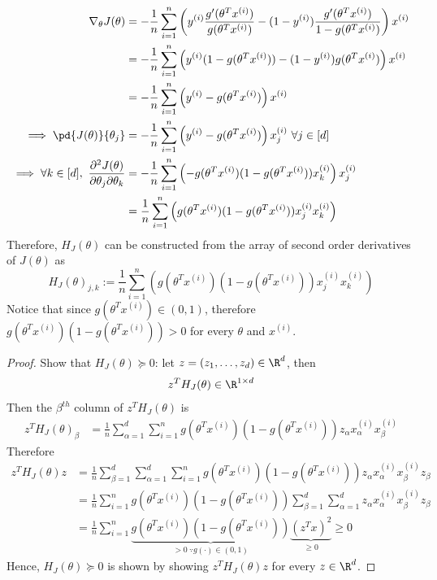 \documentclass[11pt]{article}
\newcommand{\upi}[0]{^{(i)}}
\begin{document}
	\begin{align}
		\nabla_\theta J(\theta) &= - \frac{1}{n} \sum_{i=1}^n \left(
		y\upi \frac{g'(\theta^T x\upi)}{g(\theta^T x\upi)}
		- (1 - y\upi) \frac{g'(\theta^T x\upi)}{1-g(\theta^T x\upi)}
		\right) x\upi \\
		&= - \frac{1}{n} \sum_{i=1}^n \left(
		y\upi (1 - g(\theta^T x\upi)) - (1 - y\upi) g(\theta^T x\upi)
		\right) x\upi \\
		&= - \frac{1}{n} \sum_{i=1}^n \left(
		y\upi - g(\theta^T x\upi)
		\right ) x\upi \\
		\implies \pd{J(\theta)}{\theta_j} &= - \frac{1}{n} \sum_{i=1}^n \left(
		y\upi - g(\theta^T x\upi)
		\right ) x\upi_j\ \forall j \in [d]\\
		\implies \forall k \in [d],\ \frac{\partial^2 J(\theta)}{\partial \theta_j \partial \theta_k} &= -\frac{1}{n}\sum_{i=1}^n \left (
		- g(\theta^T x\upi) (1-g(\theta^T x\upi)) x\upi_k
		\right) x\upi_j \\
		&= \frac{1}{n}\sum_{i=1}^n \left (
		g(\theta^T x\upi) (1-g(\theta^T x\upi)) x\upi_j x\upi_k
		\right)
	\end{align}
	Therefore, $H_J (\theta)$ can be constructed from the array of second order derivatives of $J(\theta)$ as 
	\begin{equation}
		H_J(\theta)_{j, k} := \frac{1}{n}\sum_{i=1}^n \left (
		g(\theta^T x\upi) (1-g(\theta^T x\upi)) x\upi_j x\upi_k
		\right)
	\end{equation}
	Notice that since $g(\theta^T x\upi) \in (0, 1)$, therefore $g(\theta^T x\upi) (1-g(\theta^T x\upi)) > 0$ for every $\theta$ and $x\upi$.
	\begin{proof} Show that $H_J (\theta) \succeq 0$: let $z = (z_1,\dots,z_d) \in \R^d$, then
		\begin{align}
			z^T H_J (\theta) \in \R^{1 \times d}
		\end{align}
		Then the $\beta^{th}$ column of $z^T H_J (\theta)$ is
		\begin{align}
			z^T H_J (\theta)_{\beta} &= \frac{1}{n} \sum_{\alpha=1}^d \sum_{i=1}^n g(\theta^T x\upi) (1-g(\theta^T x\upi)) z_\alpha x\upi_\alpha x\upi_\beta
		\end{align}
		Therefore
		\begin{align}
			z^T H_J(\theta) z &= \frac{1}{n} \sum_{\beta=1}^d \sum_{\alpha=1}^d \sum_{i=1}^n g(\theta^T x\upi) (1-g(\theta^T x\upi)) z_\alpha x\upi_\alpha x\upi_\beta z_\beta \\
			&= \frac{1}{n} \sum_{i=1}^n g(\theta^T x\upi) (1-g(\theta^T x\upi)) \sum_{\beta=1}^d \sum_{\alpha=1}^d z_\alpha x\upi_\alpha x\upi_\beta z_\beta \\
			&= \frac{1}{n} \sum_{i=1}^n \underbrace{g(\theta^T x\upi) (1-g(\theta^T x\upi))}_{> 0\ \because g(\cdot) \in (0, 1)} \underbrace{(z^T x)^2}_{\geq 0} \geq 0
		\end{align}
		Hence, $H_J(\theta) \succeq 0$ is shown by showing $z^T H_J(\theta) z$ for every $z \in \R^d$.
	\end{proof}
	
\end{document}

